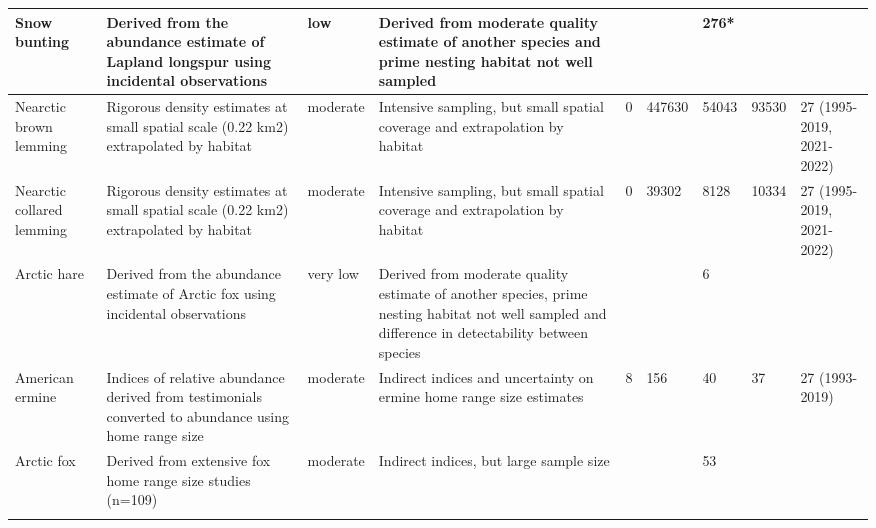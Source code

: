 \begin{longtable}{|p{}|p{}|p{}|p{}|p{}|p{}|p{}|p{}|p{}|}
   \hline
Snow bunting & Derived from the abundance estimate of Lapland longspur using incidental observations & low & Derived from moderate quality estimate of another species and prime nesting habitat not well sampled &  &  & 276* &  &  \\ 
   \hline
Nearctic brown lemming & Rigorous density estimates at small spatial scale (0.22 km2) extrapolated by habitat & moderate & Intensive sampling, but small spatial coverage and extrapolation by habitat & 0 & 447630 & 54043 & 93530 & 27 (1995-2019, 2021-2022) \\ 
   \hline
Nearctic collared lemming & Rigorous density estimates at small spatial scale (0.22 km2) extrapolated by habitat & moderate & Intensive sampling, but small spatial coverage and extrapolation by habitat & 0 & 39302 & 8128 & 10334 & 27 (1995-2019, 2021-2022) \\ 
   \hline
Arctic hare & Derived from the abundance estimate of Arctic fox using incidental observations & very low & Derived from moderate quality estimate of another species, prime nesting habitat not well sampled and difference in detectability between species &  &  & 6 &  &  \\ 
   \hline
American ermine & Indices of relative abundance derived from testimonials converted to abundance using home range size & moderate & Indirect indices and uncertainty on ermine home range size estimates & 8 & 156 & 40 & 37 & 27 (1993-2019) \\ 
   \hline
Arctic fox & Derived from extensive fox home range size studies (n=109) & moderate & Indirect indices, but large sample size &  &  & 53 &  &  \\ 
   \hline
\hline
\label{table:table_summary_methods_and_abundance}
\end{longtable}
\endgroup
